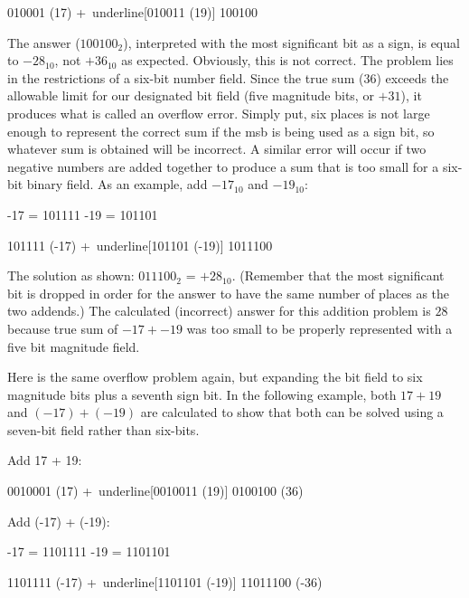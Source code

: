 \begin{binDisp}[commandchars=~\[\]]
     010001  (17)
    +~underline[010011  (19)]
     100100
\end{binDisp}

The answer ($ 100100_2 $), interpreted with the most significant bit as a sign, is equal to $ -28_{10} $, not $ +36_{10} $ as expected. Obviously, this is not correct. The problem lies in the restrictions of a six-bit number field. Since the true sum ($ 36 $) exceeds the allowable limit for our designated bit field (five magnitude bits, or $ +31 $), it produces what is called an overflow error. Simply put, six places is not large enough to represent the correct sum if the \gls{msb} is being used as a sign bit, so whatever sum is obtained will be incorrect. A similar error will occur if two negative numbers are added together to produce a sum that is too small for a six-bit binary field. As an example, add $ -17_{10} $ and $ -19_{10} $: 

\begin{binDisp}[commandchars=~\[\]]
     -17 = 101111
     -19 = 101101

     101111  (-17)
    +~underline[101101  (-19)]
    1011100
\end{binDisp}

The solution as shown: $ 011100_2 $ = $ +28_{10} $. (Remember that the most significant bit is dropped in order for the answer to have the same number of places as the two addends.) The calculated (incorrect) answer for this addition problem is $ 28 $ because true sum of $ -17 + -19 $ was too small to be properly represented with a five bit magnitude field.

Here is the same overflow problem again, but expanding the bit field to six magnitude bits plus a seventh sign bit. In the following example, both $ 17 + 19 $ and $ (-17) + (-19) $ are calculated to show that both can be solved using a seven-bit field rather than six-bits. 

Add 17 + 19:

\begin{binDisp}[commandchars=~\[\], samepage=true]
     0010001  (17)
    +~underline[0010011  (19)]
     0100100  (36)
\end{binDisp}

Add (-17) + (-19):

\begin{binDisp}[commandchars=~\[\], samepage=true]
     -17 = 1101111
     -19 = 1101101

     1101111  (-17)
    +~underline[1101101  (-19)]
    11011100  (-36)
\end{binDisp}

